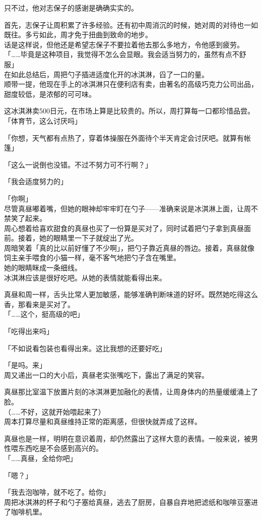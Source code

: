只不过，他对志保子的感谢是确确实实的。

首先，志保子让周积累了许多经验。还有初中周消沉的时候，她对周的对待也一如既往。多亏如此，周才免于扭曲到致命的地步。\\

话是这样说，但他还是希望志保子不要拉着他去那么多地方，令他感到疲劳。\\

「……毕竟是这种项目，我觉得不怎么会显眼。我会适当努力的，虽然有点不舒服」\\

在如此总结后，周把勺子插进适度化开的冰淇淋，舀了一口的量。\\

顺带一提，他现在手上的冰淇淋只在便利店有卖，由著名的高级巧克力公司出品，甜度较低，是浓郁的可可味。

这冰淇淋卖500日元，在市场上算是比较贵的。所以，周打算每一口都珍惜品尝。\\

「体育节，这么讨厌吗」

「你想，天气都有点热了，穿着体操服在外面待个半天肯定会讨厌吧。就算有帐篷」

「这么一说倒也没错。不过不努力可不行啊？」

「我会适度努力的」

「你啊」\\

尽管真昼嘟着嘴，但她的眼神却牢牢盯在勺子——准确来说是冰淇淋上面，让周不禁笑了起来。\\

周心想着给喜欢甜食的真昼也买了一份算是买对了，同时试着把勺子拿到真昼面前。接着，她的眼睛里一下子就绽出了光。\\

周暗笑着「真的比以前好懂了不少啊」，把勺子靠近真昼的唇边。接着，真昼就像饲主亲手喂食的小猫一样，毫不客气地把勺子含在嘴里。\\

她的眼睛眯成一条细线。\\

冰淇淋应该是很好吃吧。从她的表情就能看得出来。

真昼和周一样，舌头比常人更加敏感，能够准确判断味道的好坏。既然她吃得这么香，那看来是买对了。\\

「……这个，挺高级的吧」

「吃得出来吗」

「不如说看包装也看得出来。这比我想的还要好吃」

「是吗。来」\\

周又递出一口的大小后，真昼老实张嘴吃下，露出了满足的笑容。

真昼那比室温下放置片刻的冰淇淋更加融化的表情，让周身体内的热量缓缓涌上了脸。\\

（……不好，这就开始喂起来了）\\

周本打算尽量和真昼维持正常的距离感，但很快就弄成了这样。

真昼也是一样，明明在意识着周，却仍然露出了这样大意的表情。一般来说，被男性喂东西吃是不会感到高兴的。\\

「……真昼，全给你吧」

「嗯？」

「我去泡咖啡，就不吃了。给你」\\

周把冰淇淋的杯子和勺子塞给真昼，逃去了厨房，自暴自弃地把滤纸和咖啡豆塞进了咖啡机里。
